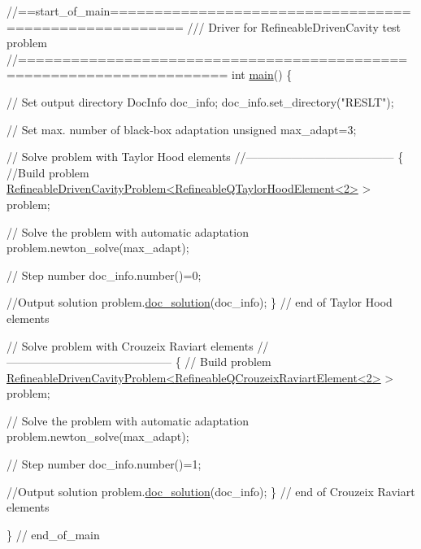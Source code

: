 \begin{DoxyCodeInclude}
\textcolor{comment}{//==start\_of\_main======================================================}
\textcolor{comment}{/// Driver for RefineableDrivenCavity test problem }
\textcolor{comment}{}\textcolor{comment}{//=====================================================================}
\textcolor{keywordtype}{int} \hyperlink{adaptive__driven__cavity_8cc_ae66f6b31b5ad750f1fe042a706a4e3d4}{main}()
\{

 \textcolor{comment}{// Set output directory}
 DocInfo doc\_info;
 doc\_info.set\_directory(\textcolor{stringliteral}{"RESLT"});


 \textcolor{comment}{// Set max. number of black-box adaptation}
 \textcolor{keywordtype}{unsigned} max\_adapt=3;

 \textcolor{comment}{// Solve problem with Taylor Hood elements}
 \textcolor{comment}{//---------------------------------------}
 \{
  \textcolor{comment}{//Build problem}
  \hyperlink{classRefineableDrivenCavityProblem}{RefineableDrivenCavityProblem<RefineableQTaylorHoodElement<2>}
       > problem;
  
  \textcolor{comment}{// Solve the problem with automatic adaptation}
  problem.newton\_solve(max\_adapt);
  
  \textcolor{comment}{// Step number}
  doc\_info.number()=0;
   
  \textcolor{comment}{//Output solution}
  problem.\hyperlink{classRefineableDrivenCavityProblem_a0baa1e8f1d1f6f73ef921b06a9b20836}{doc\_solution}(doc\_info);
 \} \textcolor{comment}{// end of Taylor Hood elements}
 

 \textcolor{comment}{// Solve problem with Crouzeix Raviart elements}
 \textcolor{comment}{//--------------------------------------------}
 \{
  \textcolor{comment}{// Build problem}
  \hyperlink{classRefineableDrivenCavityProblem}{RefineableDrivenCavityProblem<RefineableQCrouzeixRaviartElement<2>}
       > problem;
  
  \textcolor{comment}{// Solve the problem with automatic adaptation}
  problem.newton\_solve(max\_adapt);
  
  \textcolor{comment}{// Step number}
  doc\_info.number()=1;

  \textcolor{comment}{//Output solution}
  problem.\hyperlink{classRefineableDrivenCavityProblem_a0baa1e8f1d1f6f73ef921b06a9b20836}{doc\_solution}(doc\_info);
 \} \textcolor{comment}{// end of Crouzeix Raviart elements}


\} \textcolor{comment}{// end\_of\_main}

\end{DoxyCodeInclude}




